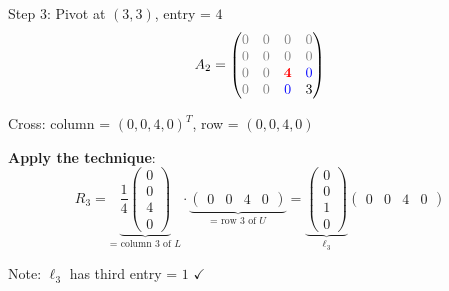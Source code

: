 \documentclass[10pt]{beamer}
\theoremstyle{definition}
\newcommand{\pvt}[1]{{\color{red}\mathbf{#1}}}       %
\newcommand{\crs}[1]{{\color{blue}#1}}                %
\newcommand{\rem}[1]{{\color{gray}#1}}                %
\begin{document}
\begin{frame}{Step 3: Pivot at $(3,3)$, entry = $4$}
$$A_2 = \begin{pmatrix}
\rem{0} & \rem{0} & \rem{0} & \rem{0} \\
\rem{0} & \rem{0} & \rem{0} & \rem{0} \\
\rem{0} & \rem{0} & \pvt{4} & \crs{0} \\
\rem{0} & \rem{0} & \crs{0} & 3
\end{pmatrix}$$

Cross: column = $(0, 0, 4, 0)^T$, row = $(0, 0, 4, 0)$

\vfill
\textbf{Apply the technique}:
$$R_3 = \underbrace{\frac{1}{4} \begin{pmatrix} 0 \\ 0 \\ 4 \\ 0 \end{pmatrix}}_{\text{= column 3 of } L}
\cdot \underbrace{\begin{pmatrix} 0 & 0 & 4 & 0 \end{pmatrix}}_{\text{= row 3 of } U}
= \underbrace{\begin{pmatrix} 0 \\ 0 \\ 1 \\ 0 \end{pmatrix}}_{\ell_3}
\begin{pmatrix} 0 & 0 & 4 & 0 \end{pmatrix}$$

Note: $\ell_3$ has third entry = $1$ $\checkmark$
\end{frame}
\end{document}
